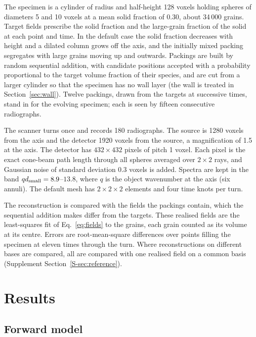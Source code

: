 \documentclass[11pt]{article}
\begin{document}
The specimen is a cylinder of radius and half-height 128 voxels holding
spheres of diameters 5 and 10 voxels at a mean solid fraction of 0.30, about
34\,000 grains. Target fields prescribe the solid fraction and the
large-grain fraction of the solid at each point and time. In the default
case the solid fraction decreases with height and a dilated column grows off
the axis, and the initially mixed packing segregates with large grains
moving up and outwards. Packings are built by random sequential addition,
with candidate positions accepted with a probability proportional to the
target volume fraction of their species, and are cut from a larger cylinder
so that the specimen has no wall layer (the wall is treated in
Section~\ref{sec:wall}). Twelve packings, drawn from the targets at
successive times, stand in for the evolving specimen; each is seen by
fifteen consecutive radiographs.

The scanner turns once and records 180 radiographs. The source is 1280
voxels from the axis and the detector 1920 voxels from the source, a
magnification of 1.5 at the axis. The detector has $432\times432$ pixels of
pitch 1 voxel. Each pixel is the exact cone-beam path length through all
spheres averaged over $2\times2$ rays, and Gaussian noise of standard
deviation 0.3 voxels is added. Spectra are kept in the band
$qd_{\rm small}=8.9$--$13.8$, where $q$ is the object wavenumber at the axis
(six annuli). The default mesh has $2\times2\times2$ elements and four time
knots per turn.

The reconstruction is compared with the fields the packings contain, which
the sequential addition makes differ from the targets. These realised fields
are the least-squares fit of Eq.~\eqref{eq:fields} to the grains, each grain
counted as its volume at its centre. Errors are root-mean-square differences
over points filling the specimen at eleven times through the turn. Where
reconstructions on different bases are compared, all are compared with one
realised field on a common basis (Supplement Section~\ref{S-sec:reference}).

\section{Results}\label{sec:results}

\subsection{Forward model}\label{sec:forward}
\end{document}
